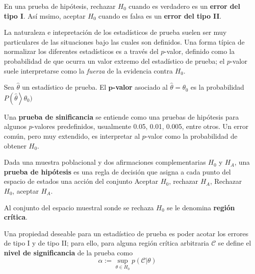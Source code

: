 \begin{definicion}
En una prueba de hipótesis, rechazar $H_0$ cuando es verdadero es un \textbf{error del tipo I}. Así msimo, aceptar $H_0$ cuando es falsa es un \textbf{error del tipo II}.
\end{definicion}

La naturaleza e intepretación de los estadísticos de prueba suelen ser muy particulares de las situaciones bajo las cuales son definidos.
%
Una forma típica de normalizar los diferentes estadísticos es a través del $p$-valor, definido como la probabilidad de que ocurra un valor extremo del estadístico de prueba; 
el $p$-valor suele interpretarse como la \textit{fuerza} de la evidencia contra $H_0$.

\begin{definicion}
Sea $\widehat{\theta}$ un estadístico de prueba. El \textbf{$\boldsymbol{p}$-valor} asociado al $\widehat{\theta}=\theta_0$ es la probabilidad $P\left(\widehat{\theta}\right>\theta_0)$
\end{definicion}

Una \textbf{prueba de sinificancia} se entiende como una pruebas de hipótesis para algunos $p$-valores predefinidos, usualmente 0.05, 0.01, 0.005, entre otros.
%
Un error común, pero muy extendido, es interpretar al $p$-valor como la probabilidad de obtener $H_0$.

\begin{definicion}
Dada una muestra poblacional y dos afirmaciones complementarias $H_0$ y $H_A$, una \textbf{prueba de hipótesis} es una regla de decisión que asigna a cada punto del espacio de estados una acción del conjunto Aceptar $H_0$, rechazar $H_A$, Rechazar $H_0$, aceptar $H_A$.

Al conjunto del espacio muestral sonde se rechaza $H_0$ se le denomina \textbf{región crítica}. 
\end{definicion}


Una propiedad deseable para un estadístico de prueba es poder acotar los errores de tipo I y de tipo II; para ello, para alguna región crítica arbitraria $\mathcal{C}$ se define el \textbf{nivel de significancia} de la prueba como
\begin{equation}
\alpha := \sup_{\theta \in H_0} p(\mathcal{C} \lvert \theta)
\end{equation}

